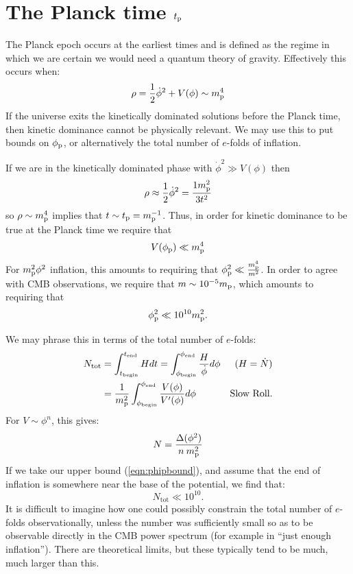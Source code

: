 \section{The Planck time $t_{\mathrm{p}}$}
The Planck epoch occurs at the earliest times and is defined as the
regime in which we are certain we would need a quantum theory of
gravity. Effectively this occurs when:
\begin{equation}
  \rho = \frac{1}{2}\dot\phi^2 + V(\phi)  \sim m_{\mathrm{p}}^4
  \label{eqn:rhosim}
\end{equation}
If the universe exits the kinetically dominated solutions before the
Planck time, then kinetic dominance cannot be physically relevant. We
may use this to put bounds on $\phi_{\mathrm{p}}$, or alternatively the total
number of $e$-folds of inflation.

If we are in the kinetically dominated phase with $\dot{\phi}^2\gg
V(\phi)$ then
\begin{equation}
              \rho \approx \frac{1}{2}\dot\phi^2= \frac{1m_{\mathrm{p}}^2}{3t^2} 
  \label{eqn:rhop}
\end{equation}
so $\rho\sim m_{\mathrm{p}}^4$ implies that $t\sim t_{\mathrm{p}}=m_{\mathrm{p}}^{-1}$. Thus, in order for
kinetic dominance to be true at the Planck time we require that
\begin{equation}
  V(\phi_{\mathrm{p}}) \ll m_{\mathrm{p}}^4
\end{equation}
For $m_{\mathrm{p}}^2\phi^2$ inflation, this amounts to requiring that $\phi_{\mathrm{p}}^2\ll
\frac{m_{\mathrm{p}}^4}{m^2}$. In order to agree with CMB observations, we require
that $m\sim10^{-5}m_{\mathrm{p}}$, which amounts to requiring that 
\begin{equation}
 \phi_{\mathrm{p}}^2 \ll 10^{10}m_{\mathrm{p}}^2 \nonumber.
 \label{eqn:phipbound}
\end{equation}

We may phrase this in terms of the total number of $e$-folds:
\begin{align}
  N_\mathrm{tot} 
  &=\int_{t_\mathrm{begin}}^{t_\mathrm{end}} H dt 
  =\int_{\phi_\mathrm{begin}}^{\phi_\mathrm{end}} 
       \frac{H}{\dot{\phi}}d\phi  &\text{($H=\dot{N}$)}
  \\
  &=\frac{1}{m_{\mathrm{p}}^2}\int_{\phi_\mathrm{begin}}^{\phi_\mathrm{end}}
     {\frac{V(\phi)}{V^\prime(\phi)}}d\phi &\text{Slow Roll.}
\end{align}
For $V\sim\phi^n$, this gives:
\begin{equation}
  N = \frac{\Delta (\phi^2) }{n\:m_{\mathrm{p}}^2}
\end{equation}
If we take our upper bound (\ref{eqn:phipbound}), and assume that the
end of inflation is somewhere near the base of the potential, we find
that: 
\begin{equation}
  N_\mathrm{tot}\ll 10^{10}.
\end{equation}
It is difficult to imagine how one could possibly constrain the total
number of $e$-folds observationally, unless the number was
sufficiently small so as to be observable directly in the CMB power
spectrum (for example in ``just enough inflation''). There are
theoretical limits, but these typically tend to be much, much larger
than this.

